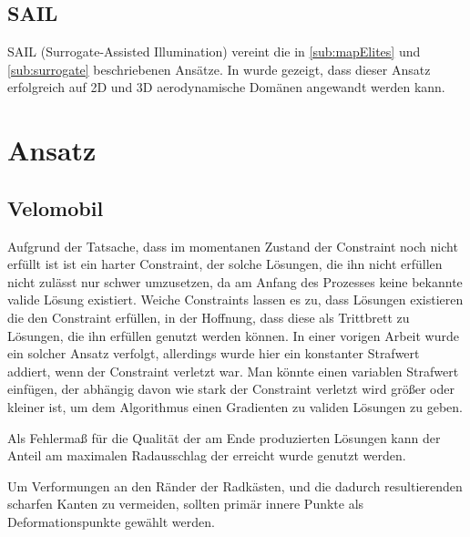 \documentclass[12pt]{article}
\begin{document}
\subsection{SAIL}

SAIL (Surrogate-Assisted Illumination) vereint die in \ref{sub:mapElites} und \ref{sub:surrogate} beschriebenen Ansätze.
In \cite{Gaier.6152018} wurde gezeigt, dass dieser Ansatz erfolgreich auf 2D und 3D aerodynamische Domänen angewandt werden kann.

\section{Ansatz}

\subsection{Velomobil}
Aufgrund der Tatsache, dass im momentanen Zustand der Constraint noch nicht erfüllt ist ist ein harter Constraint, der solche Lösungen, die ihn nicht erfüllen nicht zulässt nur schwer umzusetzen, da am Anfang des Prozesses keine bekannte valide Lösung existiert.
Weiche Constraints lassen es zu, dass Lösungen existieren die den Constraint erfüllen, in der Hoffnung, dass diese als Trittbrett zu Lösungen, die ihn erfüllen genutzt werden können.
In einer vorigen Arbeit wurde ein solcher Ansatz verfolgt, allerdings wurde hier ein konstanter Strafwert addiert, wenn der Constraint verletzt war.
Man könnte einen variablen Strafwert einfügen, der abhängig davon wie stark der Constraint verletzt wird größer oder kleiner ist, um dem Algorithmus einen Gradienten zu validen Lösungen zu geben.

Als Fehlermaß für die Qualität der am Ende produzierten Lösungen kann der Anteil am maximalen Radausschlag der erreicht wurde genutzt werden.

Um Verformungen an den Ränder der Radkästen, und die dadurch resultierenden scharfen Kanten zu vermeiden, sollten primär innere Punkte als Deformationspunkte gewählt werden.
\end{document}
